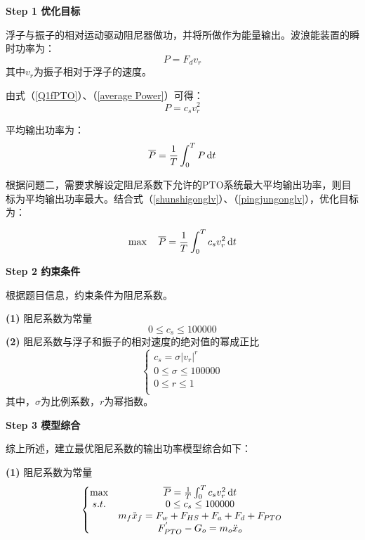 \documentclass{my_paper}
\begin{document}
\textbf{Step 1 优化目标}

浮子与振子的相对运动驱动阻尼器做功，并将所做作为能量输出。波浪能装置的瞬时功率为\cite{oskamp2012power}：
\begin{equation}
    P=F_{d} v_{r}\label{average Power}
\end{equation}
其中$v_{r} $为振子相对于浮子的速度。

由式（\ref{Q1fPTO}）、（\ref{average Power}）可得：
\begin{equation}
    P=c_{s} v_{r}^2\label{shunshigonglv}
\end{equation}

平均输出功率为：
\begin{equation}
    \overline{P}=\frac{1}{T}\int_{0}^{T}{P}\,{\rm d}t\label{pingjungonglv}
\end{equation}

根据问题二，需要求解设定阻尼系数下允许的PTO系统最大平均输出功率，则目标为平均输出功率最大。结合式（\ref{shunshigonglv}）、（\ref{pingjungonglv}），优化目标为：

$$
\max \quad \overline{P}=\frac{1}{T}\int_{0}^{T}{c_{s} v_{r}^2}\,{\rm d}t
$$

\textbf{Step 2 约束条件}

根据题目信息，约束条件为阻尼系数。

\noindent
\textbf{(1)} 阻尼系数为常量
        \begin{equation}
            0\leq c_{s}\leq 100000
        \end{equation}        
\noindent
\textbf{(2)} 阻尼系数与浮子和振子的相对速度的绝对值的幂成正比
        \begin{equation}
            \left\{\begin{matrix}
            c_{s}=\sigma \lvert v_{r}\rvert^r \\
            0\leq \sigma\leq 100000 \\
            0\leq r\leq 1 \\
            
            \end{matrix}\right.
        \end{equation}
        其中，$\sigma$为比例系数，$r$为幂指数。
    

\textbf{Step 3 模型综合}

综上所述，建立最优阻尼系数的输出功率模型综合如下：

    \textbf{(1)} 阻尼系数为常量
        \begin{equation}
            \left\{\begin{matrix}
                \max & \overline{P}=\frac{1}{T}\int_{0}^{T}{c_{s} v_{r}^2}\,{\rm d}t\\
                s.t. & 0 \leq c_s\leq 100000 \\
                    &  m_f \ddot x_f = F_w+F_{HS}+F_a+F_d+F_{PTO}\\
                    &  F_{PTO}^{'}-G_o=m_o\ddot x_o\\
            \end{matrix}
            \right.
        \end{equation}
        
\end{document}
